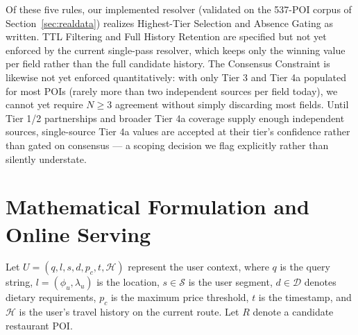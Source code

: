 \documentclass[acmsmall,screen]{acmart}
\begin{document}
Of these five rules, our implemented resolver (validated on the 537-POI corpus of Section~\ref{sec:realdata}) realizes Highest-Tier Selection and Absence Gating as written. TTL Filtering and Full History Retention are specified but not yet enforced by the current single-pass resolver, which keeps only the winning value per field rather than the full candidate history. The Consensus Constraint is likewise not yet enforced quantitatively: with only Tier 3 and Tier 4a populated for most POIs (rarely more than two independent sources per field today), we cannot yet require $N \geq 3$ agreement without simply discarding most fields. Until Tier 1/2 partnerships and broader Tier 4a coverage supply enough independent sources, single-source Tier 4a values are accepted at their tier's confidence rather than gated on consensus — a scoping decision we flag explicitly rather than silently understate.

\section{Mathematical Formulation and Online Serving}
Let $U = (q, l, s, d, p_c, t, \mathcal{H})$ represent the user context, where $q$ is the query string, $l = (\phi_u, \lambda_u)$ is the location, $s \in \mathcal{S}$ is the user segment, $d \in \mathcal{D}$ denotes dietary requirements, $p_c$ is the maximum price threshold, $t$ is the timestamp, and $\mathcal{H}$ is the user's travel history on the current route. Let $R$ denote a candidate restaurant POI.
\end{document}

